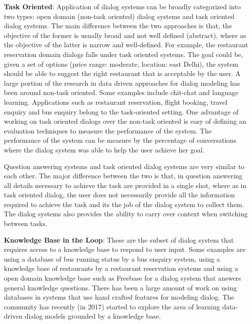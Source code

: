 \textbf{Task Oriented}: Application of dialog systems can be broadly categorized into two types: open domain (non-task oriented) dialog systems and task oriented dialog systems. The main difference between the two approaches is that, the objective of the former is usually broad and not well defined (abstract), where as the objective of the latter is  narrow and well-defined. For example, the restaurant reservation domain dialogs falls under task oriented systems. The goal could be, given a set of options (price range: moderate, location: east Delhi), the system should be able to suggest the right restaurant that is acceptable by the user. A large portion of the research in data driven approaches for dialog modeling has been around non-task oriented. Some examples include chit-chat and language learning. Applications such as restaurant reservation, flight booking, travel enquiry and bus enquiry belong to the task-oriented setting.  One advantage of working on task oriented dialogs over the non-task oriented is easy of defining an evaluation techniques to measure the performance of the system. The performance of the system can be measure by the percentage of conversations where the dialog system was able to help the user achieve her goal. 

Question answering systems and task oriented dialog systems are very similar to each other. The major difference between the two is that, in question answering all details necessary to achieve the task are provided in a single shot, where as in task oriented dialog, the user does not necessarily provide all the information required to achieve the task and its the job of the dialog system to collect them. The dialog systems also provides the ability to carry over context when switching between tasks.

\textbf{Knowledge Base in the Loop}: These are the subset of dialog system that requires access to a knowledge base to respond to user input. Some examples are  using a database of bus running status by a bus enquiry system, using a knowledge base of restaurants by a restaurant reservation systems and using a open domain knowledge base such as Freebase for a dialog system that answers general knowledge questions. There has been a large amount of work on using databases in systems that use hand crafted features for modeling dialog. The community has recently (in 2017) started to explore the area of learning data-driven dialog models grounded by a knowledge base.


